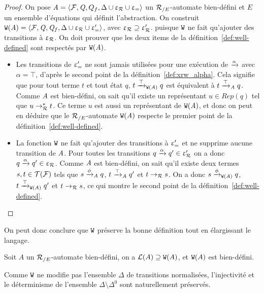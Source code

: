 \begin{proof}
  On pose $\mathit A = \langle \mathcal{F}, \mathit Q, Q_f, \Delta \cup \upvarepsilon_{\mathcal R} \cup \upvarepsilon_{=}\rangle$ un ${\mathcal R_{/E}}$-automate bien-défini et
  $E$ un ensemble d'équations qui définit l'abstraction.
  On construit $\mathtt{W}(\mathit A) = \langle \mathcal{F}, \mathit Q, \mathit Q_f, \Delta \cup \upvarepsilon_{\mathcal R} \cup \upvarepsilon_{=}'\rangle$, avec $\upvarepsilon_{\mathcal R} \supseteq \upvarepsilon_{\mathcal R}'$.
  puisque $\mathtt{W}$ ne fait qu'ajouter des transitions à $\upvarepsilon_{\mathcal R}$. On doit prouver que les deux items de la définition~\ref{def:well-defined}
  sont respectés par $\mathtt{W}(\mathit A)$.
  \begin{itemize}
  \item 
    Les transitions de $\upvarepsilon_{=}'$ ne sont jamais utilisées pour une exécution de $\xrightarrow{\alpha}$ avec $\alpha = \top$,
    d'après le second point de la définition~\ref{def:xrw_alpha}.
    Cela signifie que pour tout terme $t$ et tout état $q$, $t \xrightarrow{\top}_{\mathtt{W}(\mathit A)} q$ est équivalent à $t \xrightarrow{\top}_\mathit A q$.
    Comme $\mathit A$ est bien-défini, on sait qu'il existe un représentant $u \in Rep(q)$ tel que $u \rightarrow^*_\mathcal R t$.
    Ce terme $u$ est aussi un représentant de $\mathtt{W}(\mathit A)$, et donc on peut en déduire que le ${\mathcal R_{/E}}$-automate $\mathtt{W}(\mathit A)$ 
    respecte le premier point de la définition~\ref{def:well-defined}.

  \item
    La fonction $\mathtt{W}$ ne fait qu'ajouter des transitions à $\upvarepsilon_{=}'$ et ne supprime aucune transition de $\mathit A$.
    Pour toutes les transitions $q \xrightarrow{\alpha} q' \in \upvarepsilon_{\mathcal R}'$ on a donc $q \xrightarrow{\alpha} q' \in \upvarepsilon_{\mathcal R}$.
    Comme $\mathit A$ est bien-défini, on sait qu'il existe deux termes $s,t\in \mathcal{T(F)}$ tels que
    $s\xrightarrow{\phi}_\mathit A q$, $t\xrightarrow{\top}_\mathit A q'$ et $t \rightarrow_\mathcal R s$.
    On a donc $s\xrightarrow{\phi}_{\mathtt{W}(\mathit A)} q$, $t\xrightarrow{\top}_{\mathtt{W}(\mathit A)} q'$ et $t \rightarrow_\mathcal R s$, ce qui montre le second point
    de la définition~\ref{def:well-defined}.
  \end{itemize}
\end{proof}

On peut donc conclure que $\mathtt{W}$ préserve la bonne définition tout en élargissant le langage.

\begin{property}
  \label{thm:W}
  Soit $A$ un ${\mathcal R_{/E}}$-automate bien-défini, on a $\mathcal{L}(A) \supseteq \mathtt{W}(A)$,
  et $\mathtt{W}(A)$ est bien-défini.
\end{property}


\begin{remark}
  Comme $\mathtt{W}$ ne modifie pas l'ensemble $\Delta$ de transitions normalisées,   
  l'injectivité et le déterminisme de l'ensemble $\Delta \setminus \Delta^0$ sont naturellement
  préservés. 
\end{remark}

